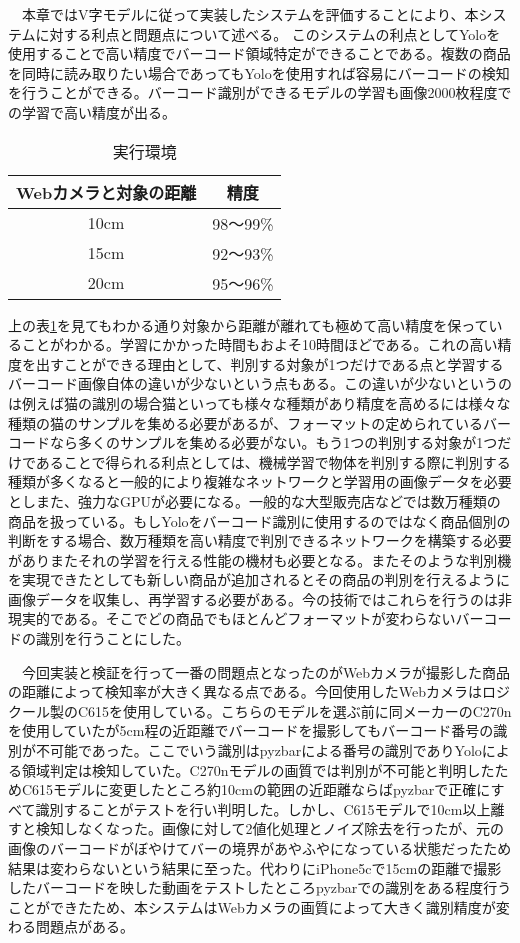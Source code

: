 　本章ではV字モデルに従って実装したシステムを評価することにより、本システムに対する利点と問題点について述べる。
このシステムの利点としてYoloを使用することで高い精度でバーコード領域特定ができることである。複数の商品を同時に読み取りたい場合であってもYoloを使用すれば容易にバーコードの検知を行うことができる。バーコード識別ができるモデルの学習も画像2000枚程度での学習で高い精度が出る。

\begin{table}[htb]
\begin{center}
\caption{実行環境}
\begin{tabular}{|c|c|} \hline
Webカメラと対象の距離 & 精度\\ \hline
10cm & 98～99\% \\ \hline
15cm & 92～93\% \\ \hline
20cm & 95～96\% \\ \hline
\end{tabular}
\label{accurancy}
	\end{center}
\end{table}

 上の表\ref{accurancy}を見てもわかる通り対象から距離が離れても極めて高い精度を保っていることがわかる。学習にかかった時間もおよそ10時間ほどである。これの高い精度を出すことができる理由として、判別する対象が1つだけである点と学習するバーコード画像自体の違いが少ないという点もある。この違いが少ないというのは例えば猫の識別の場合猫といっても様々な種類があり精度を高めるには様々な種類の猫のサンプルを集める必要があるが、フォーマットの定められているバーコードなら多くのサンプルを集める必要がない。もう1つの判別する対象が1つだけであることで得られる利点としては、機械学習で物体を判別する際に判別する種類が多くなると一般的により複雑なネットワークと学習用の画像データを必要としまた、強力なGPUが必要になる。一般的な大型販売店などでは数万種類の商品を扱っている。もしYoloをバーコード識別に使用するのではなく商品個別の判断をする場合、数万種類を高い精度で判別できるネットワークを構築する必要がありまたそれの学習を行える性能の機材も必要となる。またそのような判別機を実現できたとしても新しい商品が追加されるとその商品の判別を行えるように画像データを収集し、再学習する必要がある。今の技術ではこれらを行うのは非現実的である。そこでどの商品でもほとんどフォーマットが変わらないバーコードの識別を行うことにした。

　今回実装と検証を行って一番の問題点となったのがWebカメラが撮影した商品の距離によって検知率が大きく異なる点である。今回使用したWebカメラはロジクール製のC615を使用している。こちらのモデルを選ぶ前に同メーカーのC270nを使用していたが5cm程の近距離でバーコードを撮影してもバーコード番号の識別が不可能であった。ここでいう識別はpyzbarによる番号の識別でありYoloによる領域判定は検知していた。C270nモデルの画質では判別が不可能と判明したためC615モデルに変更したところ約10cmの範囲の近距離ならばpyzbarで正確にすべて識別することがテストを行い判明した。しかし、C615モデルで10cm以上離すと検知しなくなった。画像に対して2値化処理とノイズ除去を行ったが、元の画像のバーコードがぼやけてバーの境界があやふやになっている状態だったため結果は変わらないという結果に至った。代わりにiPhone5cで15cmの距離で撮影したバーコードを映した動画をテストしたところpyzbarでの識別をある程度行うことができたため、本システムはWebカメラの画質によって大きく識別精度が変わる問題点がある。